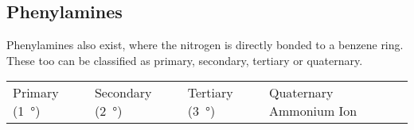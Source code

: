 

		\subsection{Phenylamines}

			Phenylamines also exist, where the nitrogen is directly bonded to a benzene ring. These too can be classified as primary, secondary,
			tertiary or quaternary.


			\begin{center}\begin{table}[ht]\renewcommand{\arraystretch}{1.4}
			\begin{tabu} to \textwidth {| X[c,m] | X[c,m] | X[c,m] | X[c,m] |}

				\hline
				\vspace{2mm}				\vspace{2mm}	&
				\vspace{2mm}			\vspace{2mm}	&
				\vspace{2mm}	\vspace{2mm}	&
				\vspace{2mm}	\vspace{2mm}\\

				\hline
				\vspace{2mm}Primary (\SI{1}{\degree})		\vspace{2mm} &
				\vspace{2mm}Secondary (\SI{2}{\degree})		\vspace{2mm} &
				\vspace{2mm}Tertiary (\SI{3}{\degree})		\vspace{2mm} &
				\vspace{2mm}Quaternary Ammonium Ion			\vspace{2mm} \\
				\hline

			\end{tabu}
			\end{table}\end{center}\vspace{-10mm}


